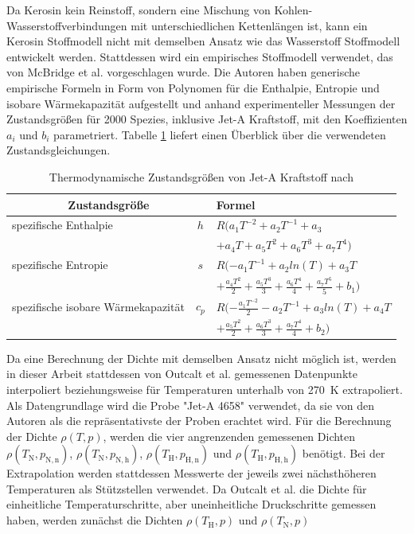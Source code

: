 Da Kerosin kein Reinstoff, sondern eine Mischung von Kohlen-Wasserstoffverbindungen mit unterschiedlichen Kettenlängen ist, kann ein Kerosin Stoffmodell nicht mit demselben Ansatz wie das Wasserstoff Stoffmodell entwickelt werden. Stattdessen wird ein empirisches Stoffmodell verwendet, das von McBridge et al. \cite{McBridge.2002} vorgeschlagen wurde. Die Autoren haben generische empirische Formeln in Form von Polynomen für die Enthalpie, Entropie und isobare Wärmekapazität aufgestellt und anhand experimenteller Messungen der Zustandsgrößen für 2000 Spezies, inklusive Jet-A Kraftstoff, mit den Koeffizienten $a_i$ und $b_i$ parametriert. Tabelle \ref{Tab:thermodynamic_properties_jeta} liefert einen Überblick über die verwendeten Zustandsgleichungen.

\begin{table}[ht]
	\centering
	\caption{Thermodynamische Zustandsgrößen von Jet-A Kraftstoff nach 
		\cite{McBridge.2002}}
	\begin{tabular} {|l|c|l|} \hline%
		\multicolumn{2}{|c|}{Zustandsgröße}  & Formel\\ \hline\hline%
		spezifische Enthalpie &$h$ & $R(a_1T^{-2}+a_2T^{-1} +a_3$ \\ 
		& & $+a_4T+a_5T^2+a_6T^3+a_7T^4)$\\ \hline
		spezifische Entropie& $s$ &  $R(-a_1T^{-1}+a_2ln(T)+a_3T$\\ 
		& & $+\frac{a_4T^2}{2}+\frac{a_5T^3}{3}+\frac{a_6T^4}{4}+\frac{a_7T^5}{5}+b_1)$\\ \hline
		spezifische isobare Wärmekapazität &$c_p$ &  $R(-\frac{a_1T^{-2}}{2}-a_2T^{-1}+a_3ln(T)+ a_4T$\\ 
		& & $+\frac{a_5T^{2}}{2}+\frac{a_6T^{3}}{3}+\frac{a_7T^{4}}{4}+b_2)$\\ \hline
	\end{tabular}	
	\label{Tab:thermodynamic_properties_jeta}%
\end{table}
\FloatBarrier 

Da eine Berechnung der Dichte mit demselben Ansatz nicht möglich ist, werden in dieser Arbeit stattdessen von Outcalt et al. \cite{Outcalt.2009} gemessenen Datenpunkte interpoliert beziehungsweise für Temperaturen unterhalb von \SI{270}{\K} extrapoliert. Als Datengrundlage wird die Probe "Jet-A 4658" verwendet, da sie von den Autoren als die repräsentativste der Proben erachtet wird. Für die Berechnung der Dichte $\rho(T,p)$, werden die vier angrenzenden gemessenen Dichten $\rho(T_\mathrm{N},p_{\mathrm{N,n}})$, $\rho(T_\mathrm{N},p_{\mathrm{N,h}})$, $\rho(T_\mathrm{H},p_{\mathrm{H,n}})$ und $\rho(T_\mathrm{H},p_{\mathrm{H,h}})$ benötigt. Bei der Extrapolation werden stattdessen Messwerte der jeweils zwei nächsthöheren Temperaturen als Stützstellen verwendet. Da Outcalt et al. die Dichte für einheitliche Temperaturschritte, aber uneinheitliche Druckschritte gemessen haben, werden zunächst die Dichten $\rho(T_\mathrm{H}, p)$ und $\rho(T_\mathrm{N}, p)$ 

